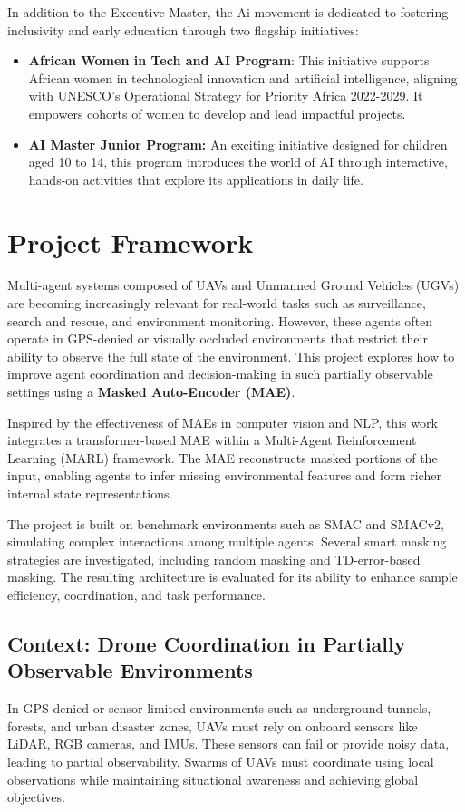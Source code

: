 In addition to the Executive Master, the Ai movement is dedicated to fostering inclusivity and early education through two flagship initiatives:

\begin{itemize}
    \item \textbf{African Women in Tech and AI Program}: This initiative supports African women in technological innovation and artificial intelligence, aligning with UNESCO's Operational Strategy for Priority Africa 2022-2029. It empowers cohorts of women to develop and lead impactful projects.
    \item \textbf{AI Master Junior Program:} An exciting initiative designed for children aged 10 to 14, this program introduces the world of AI through interactive, hands-on activities that explore its applications in daily life.
\end{itemize}


\section{Project Framework}

Multi-agent systems composed of UAVs and Unmanned Ground Vehicles (UGVs) are becoming increasingly relevant for real-world tasks such as surveillance, search and rescue, and environment monitoring. However, these agents often operate in GPS-denied or visually occluded environments that restrict their ability to observe the full state of the environment. This project explores how to improve agent coordination and decision-making in such partially observable settings using a \textbf{Masked Auto-Encoder (MAE)}.

Inspired by the effectiveness of MAEs in computer vision and NLP, this work integrates a transformer-based MAE within a Multi-Agent Reinforcement Learning (MARL) framework. The MAE reconstructs masked portions of the input, enabling agents to infer missing environmental features and form richer internal state representations.

The project is built on benchmark environments such as SMAC and SMACv2, simulating complex interactions among multiple agents. Several smart masking strategies are investigated, including random masking and TD-error-based masking. The resulting architecture is evaluated for its ability to enhance sample efficiency, coordination, and task performance.



\subsection{Context: Drone Coordination in Partially Observable Environments}
In GPS-denied or sensor-limited environments such as underground tunnels, forests, and urban disaster zones, UAVs must rely on onboard sensors like LiDAR, RGB cameras, and IMUs. These sensors can fail or provide noisy data, leading to partial observability. Swarms of UAVs must coordinate using local observations while maintaining situational awareness and achieving global objectives.

